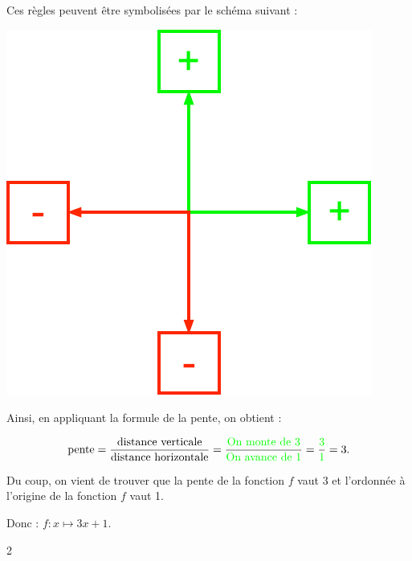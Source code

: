 \documentclass[a4paper,11pt]{report}
\begin{document}
{Ces règles peuvent être symbolisées par le schéma suivant : 

\begin{center}
\includegraphics[scale=.75]{media/FA-30/fleches.pdf}
\end{center}

Ainsi, en appliquant la formule de la pente, on obtient :

$$\mbox{pente} = \dfrac{\mbox{distance verticale}}{\mbox{distance horizontale}} = \dfrac{\mbox{\color{green}On monte de 3}}{\mbox{\color{green}On avance de 1}} = \dfrac{\color{green}3}{\color{green}1}=3. $$

Du coup, on vient de trouver que la pente de la fonction $f$ vaut 3 et l'ordonnée à l'origine de la fonction $f$ vaut 1.

Donc : $f : x \mapsto 3x+1.$
}{2}
\end{document}
